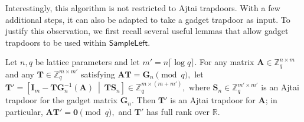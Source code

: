 Interestingly, this algorithm is not restricted to Ajtai trapdoors. With a few additional steps, it can also be adapted to take a gadget trapdoor as input. To justify this observation, we first recall several useful lemmas that allow gadget trapdoors to be used within $\mathsf{SampleLeft}$.
\begin{lemma}
\label{lemA:1}
Let $n,q$ be lattice parameters and let $m' = n\lceil \log q\rceil$.
For any matrix $\mathbf A \in \mathbb Z_q^{n \times m}$ and any
$\mathbf T \in \mathbb Z_q^{m \times m'}$ satisfying
$
    \mathbf A \mathbf T = \mathbf G_n \pmod q,
$
let
$
    \mathbf T'
    =
    \left[
        \mathbf I_m - \mathbf T \mathbf G_n^{-1}(\mathbf A)
        \ \middle|\ 
        \mathbf T \mathbf S_n
    \right]
    \in \mathbb Z_q^{m \times (m+m')},
$
where $\mathbf S_n \in \mathbb Z_q^{m' \times m'}$ is an Ajtai trapdoor
for the gadget matrix $\mathbf G_n$.
Then $\mathbf T'$ is an Ajtai trapdoor for $\mathbf A$; in particular,
$
    \mathbf A \mathbf T' = \mathbf 0 \pmod q,
$
and $\mathbf T'$ has full rank over $\mathbb R$.
\end{lemma}

